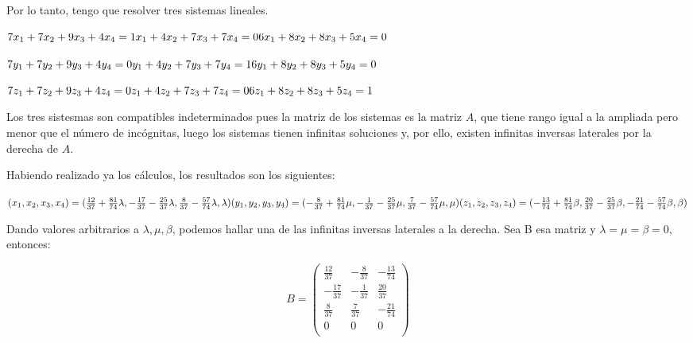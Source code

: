 \documentclass[11pt, a4paper]{article}
\newif\IfInSansMode
\theoremstyle{theorem-style}
\theoremstyle{definition-style}
\theoremstyle{remark-style}
\theoremstyle{example-style}
\begin{document}
Por lo tanto, tengo que resolver tres sistemas lineales.

$7x_1+7x_2+9x_3+4x_4=1 \\
x_1+4x_2+7x_3+7x_4=0 \\
6x_1+8x_2+8x_3+5x_4=0 $

$7y_1+7y_2+9y_3+4y_4=0 \\
y_1+4y_2+7y_3+7y_4=1 \\
6y_1+8y_2+8y_3+5y_4=0$

$7z_1+7z_2+9z_3+4z_4=0 \\
z_1+4z_2+7z_3+7z_4=0 \\
6z_1+8z_2+8z_3+5z_4=1$

Los tres sistesmas son compatibles indeterminados pues la matriz de los sistemas es la matriz $A$, que tiene rango igual a la ampliada pero menor que el número de incógnitas, luego los sistemas tienen infinitas soluciones y, por ello, existen infinitas inversas laterales por la derecha de $A$.

Habiendo realizado ya los cálculos, los resultados son los siguientes:

$(x_1,x_2,x_3,x_4) = (\frac{12}{37}+\frac{81}{74}\lambda,-\frac{17}{37}-\frac{25}{37}\lambda,\frac{8}{37}-\frac{57}{74}\lambda,\lambda) \\
(y_1,y_2,y_3,y_4) = (-\frac{8}{37}+\frac{81}{74}\mu,-\frac{1}{37}-\frac{25}{37}\mu,\frac{7}{37}-\frac{57}{74}\mu,\mu) \\
(z_1,z_2,z_3,z_4) = (-\frac{13}{74}+\frac{81}{74}\beta,\frac{20}{37}-\frac{25}{37}\beta,-\frac{21}{74}-\frac{57}{74}\beta,\beta)$

Dando valores arbitrarios a $\lambda, \mu, \beta$, podemos hallar una de las infinitas inversas laterales a la derecha. Sea B esa matriz y $\lambda = \mu = \beta = 0$, entonces:

$$B = \begin{pmatrix}
\frac{12}{37} & -\frac{8}{37} & -\frac{13}{74} \\
-\frac{17}{37} & -\frac{1}{37} & \frac{20}{37} \\
\frac{8}{37} & \frac{7}{37} & -\frac{21}{74} \\
0 & 0 & 0 \\
\end{pmatrix}$$



\end{document}
